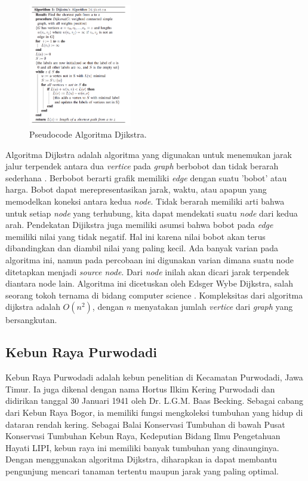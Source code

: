 \documentclass[conference]{IEEEtran}
\begin{document}
\begin{figure}[H]
    \centerline{\includegraphics[width=0.4\textwidth]{./sources/algoritma_djikstra.png}}
    \caption{Pseudocode Algoritma Djikstra.}
    \label{fig1}
\end{figure}

    Algoritma Dijkstra adalah algoritma yang digunakan untuk
    menemukan jarak jalur terpendek antara dua \textit{vertice} pada
    \textit{graph} berbobot dan tidak berarah sederhana \cite{koshy2004discrete}. Berbobot
    berarti grafik memiliki \textit{edge} dengan suatu 'bobot' atau harga.
    Bobot dapat merepresentasikan jarak, waktu, atau apapun
    yang memodelkan koneksi antara kedua \textit{node}. Tidak berarah
    memiliki arti bahwa untuk setiap \textit{node} yang terhubung, kita
    dapat mendekati suatu \textit{node} dari kedua arah. Pendekatan Dijikstra juga memiliki asumsi bahwa bobot pada \textit{edge} memiliki
    nilai yang tidak negatif. Hal ini karena nilai bobot akan
    terus dibandingkan dan diambil nilai yang paling kecil. Ada
    banyak varian pada algoritma ini, namun pada percobaan
    ini digunakan varian dimana suatu node ditetapkan menjadi
    \textit{source node}. Dari \textit{node} inilah akan dicari jarak terpendek
    diantara node lain. Algoritma ini dicetuskan oleh Edsger
    Wybe Dijkstra, salah seorang tokoh ternama di bidang computer science \cite{dijkstra1959note}. Kompleksitas dari algoritma dijkstra adalah $O(n^2)$,
    dengan $n$ menyatakan jumlah \textit{vertice} dari \textit{graph} yang
    bersangkutan.

\subsection{Kebun Raya Purwodadi}

    Kebun Raya Purwodadi adalah kebun penelitian di Kecamatan Purwodadi, Jawa Timur. Ia juga dikenal dengan nama
    Hortus Ilkim Kering Purwodadi dan didirikan tanggal 30 Januari 1941 oleh Dr. L.G.M. Baas Becking. Sebagai cabang dari
    Kebun Raya Bogor, ia memiliki fungsi mengkoleksi tumbuhan
    yang hidup di dataran rendah kering. Sebagai Balai Konservasi
    Tumbuhan di bawah Pusat Konservasi Tumbuhan Kebun Raya,
    Kedeputian Bidang Ilmu Pengetahuan Hayati LIPI, kebun raya
    ini memiliki banyak tumbuhan yang dinaunginya. Dengan
    menggunakan algoritma Dijkstra, diharapkan ia dapat membantu pengunjung mencari tanaman tertentu maupun jarak
    yang paling optimal.
\end{document}
